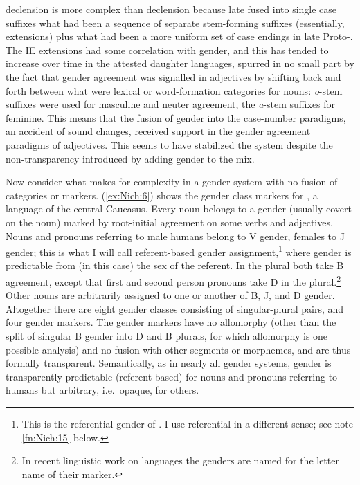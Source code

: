 \documentclass[output=collectionpaper]{langsci/langscibook}
\begin{document}
 declension is more complex than  declension because late  fused into single case suffixes what had been a sequence of separate stem-forming suffixes (essentially, extensions) plus what had been a more uniform set of case endings in late Proto-. The IE extensions had some correlation with gender, and this has tended to increase over time in the attested daughter languages, spurred in no small part by the fact that gender agreement was signalled in adjectives by shifting back and forth between what were lexical or word-formation categories for nouns: \textit{o}-stem suffixes were used for masculine and neuter agreement, the \textit{a}-stem suffixes for feminine. This means that the fusion of gender into the case-number paradigms, an accident of  sound changes, received support in the gender agreement paradigms of adjectives. This seems to have stabilized the system despite the non-transparency introduced by adding gender to the mix.

Now consider what makes for complexity in a gender system with no fusion of categories or markers. (\ref{ex:Nich:6}) shows the gender class markers for , a  language of the central Caucasus. Every noun belongs to a gender (usually covert on the noun) marked by root-initial agreement on some verbs and adjectives. Nouns and pronouns referring to male humans belong to V gender, females to J gender; this is what I will call referent-based gender assignment,\footnote{%
This is the referential gender of \citet{Dahl2000a}.  I use referential in a different sense; see note \ref{fn:Nich:15} below.
} %
where gender is predictable from (in this case) the sex of the referent.  In the plural both take B agreement, except that first and second person pronouns take D in the plural.\footnote{%
In recent linguistic work on  languages the genders are named for the letter name of their marker.
} %
Other nouns are arbitrarily assigned to one or another of B, J, and D gender. Altogether there are eight gender classes consisting of singular-plural pairs, and four gender markers. The gender markers have no allomorphy (other than the split of singular B gender into D and B plurals, for which allomorphy is one possible analysis) and no fusion with other segments or morphemes, and are thus formally transparent. Semantically, as in nearly all gender systems, gender is transparently predictable (referent-based) for nouns and pronouns referring to humans but arbitrary, i.e.\ opaque, for others.
\end{document}
